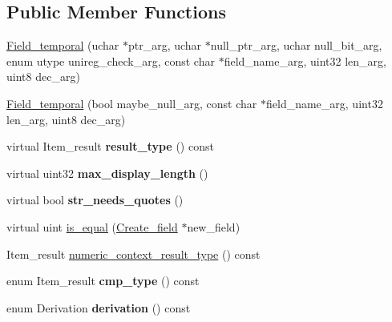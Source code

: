 \subsection*{Public Member Functions}
\begin{DoxyCompactItemize}
\item 
\mbox{\hyperlink{classField__temporal_a2c22c4b8db86b16bffd9bb5a941b9455}{Field\+\_\+temporal}} (uchar $\ast$ptr\+\_\+arg, uchar $\ast$null\+\_\+ptr\+\_\+arg, uchar null\+\_\+bit\+\_\+arg, enum utype unireg\+\_\+check\+\_\+arg, const char $\ast$field\+\_\+name\+\_\+arg, uint32 len\+\_\+arg, uint8 dec\+\_\+arg)
\item 
\mbox{\hyperlink{classField__temporal_a80fd9c8c387d9786056b44381a071772}{Field\+\_\+temporal}} (bool maybe\+\_\+null\+\_\+arg, const char $\ast$field\+\_\+name\+\_\+arg, uint32 len\+\_\+arg, uint8 dec\+\_\+arg)
\item 
\mbox{\label{classField__temporal_a70ae82a2393549be2a2f9fc45bb32feb}} 
virtual Item\+\_\+result {\bfseries result\+\_\+type} () const
\item 
\mbox{\label{classField__temporal_a6901b4c55c5b1fca811a8347c1732c72}} 
virtual uint32 {\bfseries max\+\_\+display\+\_\+length} ()
\item 
\mbox{\label{classField__temporal_ade434d3e3d3051bf9e1ce07e32313e33}} 
virtual bool {\bfseries str\+\_\+needs\+\_\+quotes} ()
\item 
virtual uint \mbox{\hyperlink{classField__temporal_ad9e7766bb91a905a5d81cc1b30d73cfb}{is\+\_\+equal}} (\mbox{\hyperlink{classCreate__field}{Create\+\_\+field}} $\ast$new\+\_\+field)
\item 
Item\+\_\+result \mbox{\hyperlink{classField__temporal_aa513969b17439a95085975d1ecebe670}{numeric\+\_\+context\+\_\+result\+\_\+type}} () const
\item 
\mbox{\label{classField__temporal_a388e0b51eaba5323556e6c3fec8b3e53}} 
enum Item\+\_\+result {\bfseries cmp\+\_\+type} () const
\item 
\mbox{\label{classField__temporal_aeedb0d00f64f589bb7f1eb7afbc382cc}} 
enum Derivation {\bfseries derivation} () const
\item 
\mbox{\label{classField__temporal_aaac68af56be9b4fb8442c0a84f21e4b6}} 

\end{DoxyCompactItemize}
